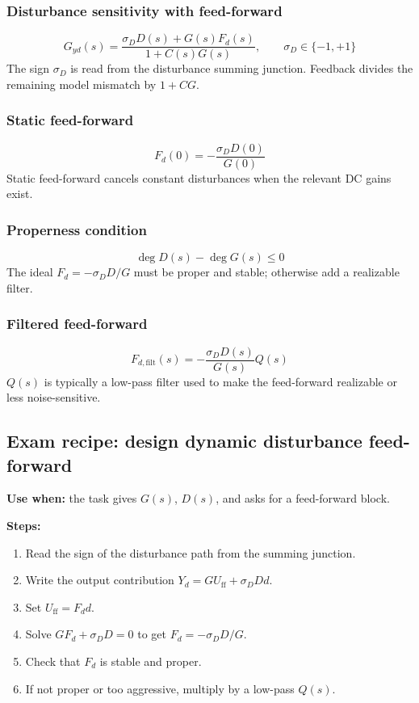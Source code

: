 \subsubsection{Disturbance sensitivity with feed-forward}
\[
G_{yd}(s)=\frac{\sigma_DD(s)+G(s)F_d(s)}{1+C(s)G(s)},\qquad \sigma_D\in\{-1,+1\}
\]
The sign \(\sigma_D\) is read from the disturbance summing junction. Feedback divides the remaining model mismatch by \(1+CG\).

\subsubsection{Static feed-forward}
\[
F_d(0)=-\frac{\sigma_DD(0)}{G(0)}
\]
Static feed-forward cancels constant disturbances when the relevant DC gains exist.

\subsubsection{Properness condition}
\[
\deg D(s)-\deg G(s)\leq0
\]
The ideal \(F_d=-\sigma_DD/G\) must be proper and stable; otherwise add a realizable filter.

\subsubsection{Filtered feed-forward}
\[
F_{d,\mathrm{filt}}(s)=-\frac{\sigma_DD(s)}{G(s)}Q(s)
\]
\(Q(s)\) is typically a low-pass filter used to make the feed-forward realizable or less noise-sensitive.

\subsection{Exam recipe: design dynamic disturbance feed-forward}

\textbf{Use when:} the task gives \(G(s)\), \(D(s)\), and asks for a feed-forward block.

\textbf{Steps:}
\begin{enumerate}
\item Read the sign of the disturbance path from the summing junction.
\item Write the output contribution \(Y_d=G U_{\mathrm{ff}}+\sigma_DD d\).
\item Set \(U_{\mathrm{ff}}=F_d d\).
\item Solve \(G F_d+\sigma_DD=0\) to get \(F_d=-\sigma_DD/G\).
\item Check that \(F_d\) is stable and proper.
\item If not proper or too aggressive, multiply by a low-pass \(Q(s)\).
\end{enumerate}

